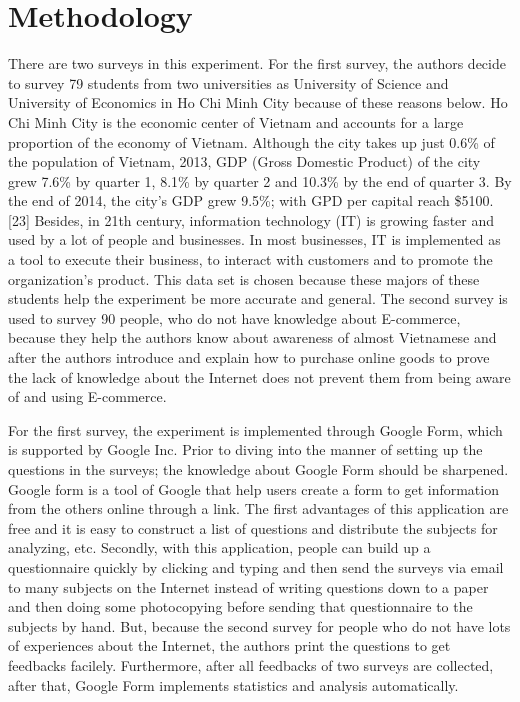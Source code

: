 \documentclass[conference]{IEEEtran}
\begin{document}
\section{Methodology} \label{method}
There are two surveys in this experiment. For the first survey, the authors decide to survey 79 students from two universities as University of Science and University of Economics in Ho Chi Minh City because of these reasons below. Ho Chi Minh City is the economic center of Vietnam and accounts for a large proportion of the economy of Vietnam. Although the city takes up just 0.6\% of the population of Vietnam, 2013, GDP (Gross Domestic Product) of the city grew 7.6\% by quarter 1, 8.1\% by quarter 2 and 10.3\% by the end of quarter 3. By the end of 2014, the city’s GDP grew 9.5\%; with GPD per capital reach \$5100. [23] Besides, in 21th century, information technology (IT) is growing faster and used by a lot of people and businesses. In most businesses, IT is implemented as a tool to execute their business, to interact with customers and to promote the organization’s product. This data set is chosen because these majors of these students help the experiment be more accurate and general. 
The second survey is used to survey 90 people, who do not have knowledge about E-commerce, because they help the authors know about awareness of almost Vietnamese and after the authors introduce and explain how to purchase online goods to prove the lack of knowledge about the Internet does not prevent them from being aware of and using E-commerce.

For the first survey, the experiment is implemented through Google Form, which is supported by Google Inc. Prior to diving into the manner of setting up the questions in the surveys; the knowledge about Google Form should be sharpened. Google form is a tool of Google that help users create a form to get information from the others online through a link. The first advantages of this application are free and it is easy to construct a list of questions and distribute the subjects for analyzing, etc. Secondly, with this application, people can build up a questionnaire quickly by clicking and typing and then send the surveys via email to many subjects on the Internet instead of writing questions down to a paper and then doing some photocopying before sending that questionnaire to the subjects by hand. But, because the second survey for people who do not have lots of experiences about the Internet, the authors print the questions to get feedbacks facilely. Furthermore, after all feedbacks of two surveys are collected, after that, Google Form implements statistics and analysis automatically.
\end{document}
